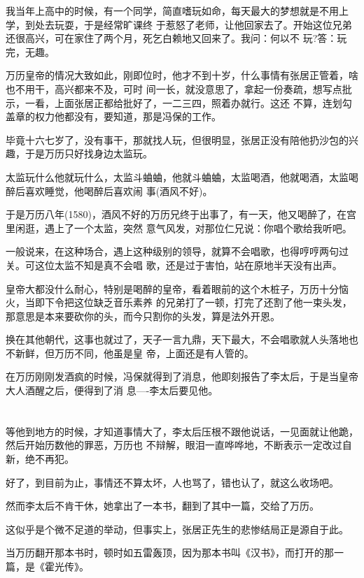 \documentclass[11pt,a4paper,onecolumn]{article}
\begin{document}
我当年上高中的时候，有一个同学，简直嗜玩如命，每天最大的梦想就是不用上学，到处去玩耍，于是经常旷课终
于惹怒了老师，让他回家去了。开始这位兄弟还很高兴，可在家住了两个月，死乞白赖地又回来了。我问：何以不
玩?答：玩完，无趣。

万历皇帝的情况大致如此，刚即位时，他才不到十岁，什么事情有张居正管着，啥也不用干，高兴都来不及，可时
间一长，就没意思了，拿起一份奏疏，想写点批示，一看，上面张居正都给批好了，一二三四，照着办就行。这还
不算，连划勾盖章的权力他都没有，要知道，那是冯保的工作。

毕竟十六七岁了，没有事干，那就找人玩，但很明显，张居正没有陪他扔沙包的兴趣，于是万历只好找身边太监玩。

太监玩什么他就玩什么，太监斗蛐蛐，他就斗蛐蛐，太监喝酒，他就喝酒，太监喝醉后喜欢睡觉，他喝醉后喜欢闹
事(酒风不好)。

于是万历八年(1580)，酒风不好的万历兄终于出事了，有一天，他又喝醉了，在宫里闲逛，遇上了一个太监，突然
意气风发，对那位仁兄说：你唱个歌给我听吧。

一般说来，在这种场合，遇上这种级别的领导，就算不会唱歌，也得哼哼两句过关。可这位太监不知是真不会唱
歌，还是过于害怕，站在原地半天没有出声。

皇帝大都没什么耐心，特别是喝醉的皇帝，看着眼前的这个木桩子，万历十分恼火，当即下令把这位缺乏音乐素养
的兄弟打了一顿，打完了还割了他一束头发，那意思是本来要砍你的头，而今只割你的头发，算是法外开恩。

换在其他朝代，这事也就过了，天子一言九鼎，天下最大，不会唱歌就人头落地也不新鲜，但万历不同，他虽是皇
帝，上面还是有人管的。

在万历刚刚发酒疯的时候，冯保就得到了消息，他即刻报告了李太后，于是当皇帝大人酒醒之后，便得到了消
息----李太后要见他。

\section[\thesection]{}

等他到地方的时候，才知道事情大了，李太后压根不跟他说话，一见面就让他跪，然后开始历数他的罪恶，万历也
不辩解，眼泪一直哗哗地，不断表示一定改过自新，绝不再犯。

好了，到目前为止，事情还不算太坏，人也骂了，错也认了，就这么收场吧。

然而李太后不肯干休，她拿出了一本书，翻到了其中一篇，交给了万历。

这似乎是个微不足道的举动，但事实上，张居正先生的悲惨结局正是源自于此。

当万历翻开那本书时，顿时如五雷轰顶，因为那本书叫《汉书》，而打开的那一篇，是《霍光传》。
\end{document}
